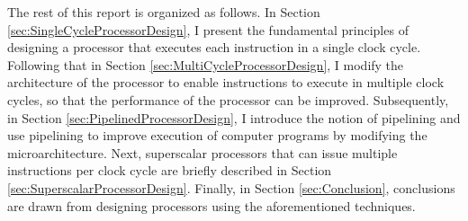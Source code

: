 The rest of this report is organized as follows. In Section \ref{sec:SingleCycleProcessorDesign}, I present the fundamental principles of designing a processor that executes each instruction in a single clock cycle. Following that in Section \ref{sec:MultiCycleProcessorDesign}, I modify the architecture of the processor to enable instructions to execute in multiple clock cycles, so that the performance of the processor can be improved. Subsequently, in Section \ref{sec:PipelinedProcessorDesign}, I introduce the notion of pipelining and use pipelining to improve execution of computer programs by modifying the microarchitecture. Next, superscalar processors that can issue multiple instructions per clock cycle are briefly described in Section \ref{sec:SuperscalarProcessorDesign}. Finally, in Section \ref{sec:Conclusion}, conclusions are drawn from designing processors using the aforementioned techniques.




